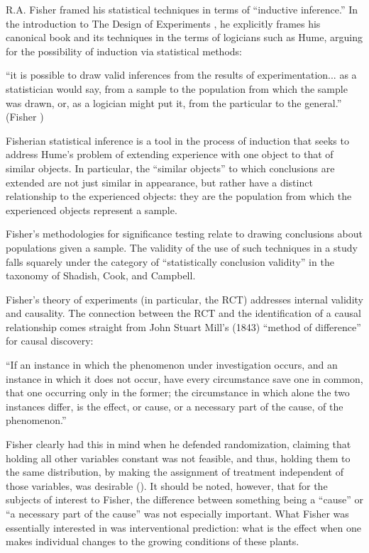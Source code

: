 \documentclass[a4paper,12pt]{article}
\begin{document}
R.A. Fisher framed his statistical techniques in terms of ``inductive inference.'' In the introduction to The Design of Experiments \parencite*{Fisher1935}, he explicitly frames his canonical book and its techniques in the terms of logicians such as Hume, arguing for the possibility of induction via statistical methods:
%
\begin{displayquote}
``it is possible to draw valid inferences from the results of experimentation... as a statistician would say, from a sample to the population from which the sample was drawn, or, as a logician might put it, from the particular to the general.'' (Fisher   )
\end{displayquote}

Fisherian statistical inference is a tool in the process of induction that seeks to address Hume's problem of extending experience with one object to that of similar objects. In particular, the ``similar objects'' to which conclusions are extended are not just similar in appearance, but rather have a distinct relationship to the experienced objects: they are the population from which the experienced objects represent a sample.

Fisher's methodologies for significance testing relate to drawing conclusions about populations given a sample. The validity of the use of such techniques in a study falls squarely under the category of ``statistically conclusion validity'' in the taxonomy of Shadish, Cook, and Campbell.

Fisher's theory of experiments (in particular, the RCT) addresses internal validity and causality. The connection between the RCT and the identification of a causal relationship comes straight from John Stuart Mill's (1843) ``method of difference'' for causal discovery:

\begin{displayquote}
  ``If an instance in which the phenomenon under investigation occurs, and an instance in which it does not occur, have every circumstance save one in common, that one occurring only in the former; the circumstance in which alone the two instances differ, is the effect, or cause, or a necessary part of the cause, of the phenomenon.''
\end{displayquote}

Fisher \parencite*{Fisher1935} clearly had this in mind when he defended randomization, claiming that holding all other variables constant was not feasible, and thus, holding them to the same distribution, by making the assignment of treatment independent of those variables, was desirable (\cite{Rosenbaum2005}). It should be noted, however, that for the subjects of interest to Fisher, the difference between something being a ``cause'' or ``a necessary part of the cause'' was not especially important. What Fisher was essentially interested in was interventional prediction: what is the effect when one makes individual changes to the growing conditions of these plants.
\end{document}
